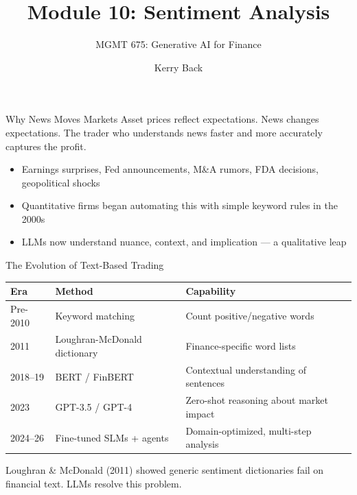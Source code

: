 \documentclass[aspectratio=169]{beamer}
\subtitle{MGMT 675: Generative AI for Finance}
\title{Module 10: Sentiment Analysis}
\author{Kerry Back}
\date{}
\begin{document}
\maketitle


\begin{frame}{Why News Moves Markets}
Asset prices reflect expectations. News changes expectations. The trader who \alert{understands news faster and more accurately} captures the profit.
\vspace{0.3cm}
\begin{itemize}
  \item Earnings surprises, Fed announcements, M\&A rumors, FDA decisions, geopolitical shocks
  \item Quantitative firms began automating this with simple keyword rules in the 2000s
  \item \alert{LLMs now understand nuance, context, and implication} --- a qualitative leap
\end{itemize}
\end{frame}

\begin{frame}{The Evolution of Text-Based Trading}
\begin{center}
\small
\begin{tabular}{@{} l l l @{}}
\toprule
\textbf{Era} & \textbf{Method} & \textbf{Capability} \\
\midrule
Pre-2010 & Keyword matching & Count positive/negative words \\
2011 & Loughran-McDonald dictionary & Finance-specific word lists \\
2018--19 & BERT / FinBERT & Contextual understanding of sentences \\
2023 & GPT-3.5 / GPT-4 & Zero-shot reasoning about market impact \\
2024--26 & Fine-tuned SLMs + agents & Domain-optimized, multi-step analysis \\
\bottomrule
\end{tabular}
\end{center}
\vspace{0.3cm}
Loughran \& McDonald (2011) showed generic sentiment dictionaries fail on financial text. LLMs resolve this problem.
\end{frame}

\end{document}

